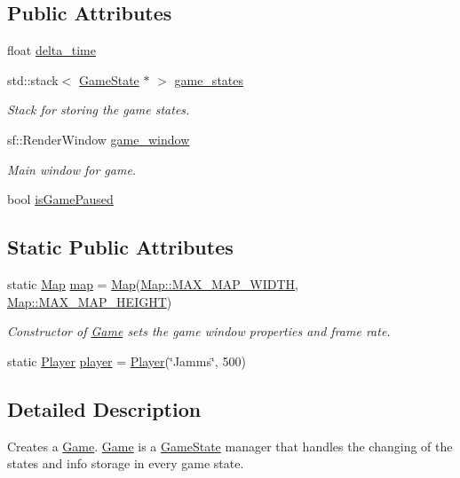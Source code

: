 \subsection*{Public Attributes}
\begin{DoxyCompactItemize}
\item 
float \hyperlink{class_game_ac66b5c6782d42e6c7344fad1cda50b67}{delta\+\_\+time}
\item 
std\+::stack$<$ \hyperlink{class_game_state}{Game\+State} $\ast$ $>$ \hyperlink{class_game_a5ed7be8060ef5d384b62f384fb8662ed}{game\+\_\+states}
\begin{DoxyCompactList}\small\item\em Stack for storing the game states. \end{DoxyCompactList}\item 
sf\+::\+Render\+Window \hyperlink{class_game_ae19475408ec62b8ed6d4109b56d28b1d}{game\+\_\+window}
\begin{DoxyCompactList}\small\item\em Main window for game. \end{DoxyCompactList}\item 
bool \hyperlink{class_game_aa897c46d369e8ab808ba5463691511da}{is\+Game\+Paused}
\end{DoxyCompactItemize}
\subsection*{Static Public Attributes}
\begin{DoxyCompactItemize}
\item 
static \hyperlink{class_map}{Map} \hyperlink{class_game_ab910de42d0cf4238d9d20815de472523}{map} = \hyperlink{class_map}{Map}(\hyperlink{class_map_ae9582bc1e99bdf1ecc5413f81cc95f69}{Map\+::\+M\+A\+X\+\_\+\+M\+A\+P\+\_\+\+W\+I\+D\+T\+H}, \hyperlink{class_map_aef313313ef5bbeafeae1f6b66073bace}{Map\+::\+M\+A\+X\+\_\+\+M\+A\+P\+\_\+\+H\+E\+I\+G\+H\+T})
\begin{DoxyCompactList}\small\item\em Constructor of \hyperlink{class_game}{Game} sets the game window properties and frame rate. \end{DoxyCompactList}\item 
static \hyperlink{class_player}{Player} \hyperlink{class_game_a6e48721b0532833b99fd5615a3628792}{player} = \hyperlink{class_player}{Player}(\char`\"{}Jamms\char`\"{}, 500)
\end{DoxyCompactItemize}


\subsection{Detailed Description}
Creates a \hyperlink{class_game}{Game}. \hyperlink{class_game}{Game} is a \hyperlink{class_game_state}{Game\+State} manager that handles the changing of the states and info storage in every game state. 

